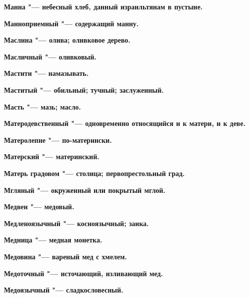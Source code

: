 \bfseries Манна \normalfont{} "--- небесный хлеб, данный израильтянам в пустыне. 




\bfseries Манноприемный \normalfont{} "--- содержащий манну. 




\bfseries Маслина \normalfont{} "--- олива; оливковое дерево. 




\bfseries Масличный \normalfont{} "--- оливковый. 




\bfseries Мастити \normalfont{} "--- намазывать. 




\bfseries Маститый \normalfont{} "--- обильный; тучный; заслуженный. 




\bfseries Масть \normalfont{} "--- мазь; масло. 




\bfseries Матеродевственный \normalfont{} "--- одновременно относящийся и к матери, и к деве. 




\bfseries Матеролепне \normalfont{} "--- по-матерински. 




\bfseries Матерский \normalfont{} "--- материнский. 




\bfseries Матерь градовом \normalfont{} "--- столица; первопрестольный град. 




\bfseries Мгляный \normalfont{} "--- окруженный или покрытый мглой. 




\bfseries Медвен \normalfont{} "--- медовый. 




\bfseries Медленоязычный \normalfont{} "--- косноязычный; заика. 




\bfseries Медница \normalfont{} "--- медная монетка. 




\bfseries Медовина \normalfont{} "--- вареный мед с хмелем. 




\bfseries Медоточный \normalfont{} "--- источающий, изливающий мед. 




\bfseries Медоязычный \normalfont{} "--- сладкословесный. 




